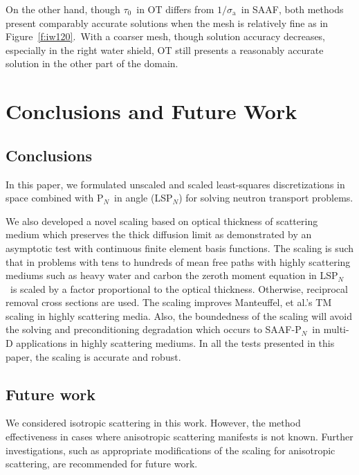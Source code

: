 \documentclass[review]{elsarticle}
\newcommand{\pn}{P$_N$}
\newcommand{\siga}{\sigma_\mathrm{a}}
\begin{document}
On the other hand, though $\tau_0$\ in OT differs from $1/\siga$\ in SAAF, both methods present comparably accurate solutions when the mesh is relatively fine as in Figure\ \ref{f:iw120}.\ With a coarser mesh, though solution accuracy decreases, especially in the right water shield, OT still presents a reasonably accurate solution in the other part of the domain.
\section{Conclusions and Future Work}
\label{s:con}
\subsection{Conclusions}
In this paper, we formulated unscaled and scaled least-squares discretizations in space combined with \pn\ in angle (LS\pn) for solving neutron transport problems.

We also developed a novel scaling based on optical thickness of scattering medium which preserves the thick diffusion limit as demonstrated by an asymptotic test with continuous finite element basis functions. The scaling is such that in problems with tens to hundreds of mean free paths with highly scattering mediums such as heavy water and carbon the zeroth moment equation in LS\pn\ is scaled by a factor proportional to the optical thickness. Otherwise, reciprocal removal cross sections are used. The scaling improves Manteuffel, et al.'s TM scaling in highly scattering media. Also, the boundedness of the scaling will avoid the solving and preconditioning degradation which occurs to SAAF-\pn\ in multi-D applications in highly scattering mediums. In all the tests presented in this paper, the scaling is accurate and robust.

\subsection{Future work}
{We considered isotropic scattering in this work. However, the method effectiveness in cases where anisotropic scattering manifests is not known. Further investigations, such as appropriate modifications of the scaling for anisotropic scattering, are recommended for future work.}
\end{document}
